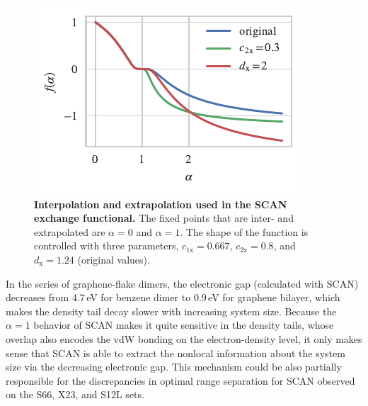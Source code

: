 \begin{figure}
\centering
\includegraphics{../media/scan-interp}
\caption{\textbf{Interpolation and extrapolation used in the SCAN exchange functional.}
The fixed points that are inter- and extrapolated are $\alpha=0$ and $\alpha=1$.
The shape of the function is controlled with three parameters, $c_\mathrm{1x}=0.667$, $c_\mathrm{2x}=0.8$, and $d_\mathrm x=1.24$ (original values).
}\label{fig:scan-interp}
\end{figure}

In the series of graphene-flake dimers, the electronic gap (calculated with SCAN) decreases from 4.7\,eV for benzene dimer to 0.9\,eV for graphene bilayer, which makes the density tail decay slower with increasing system size.
Because the $\alpha=1$ behavior of SCAN makes it quite sensitive in the density tails, whose overlap also encodes the vdW bonding on the electron-density level, it only makes sense that SCAN is able to extract the nonlocal information about the system size via the decreasing electronic gap.
This mechanism could be also partially responsible for the discrepancies in optimal range separation for SCAN observed on the S66, X23, and S12L sets.

